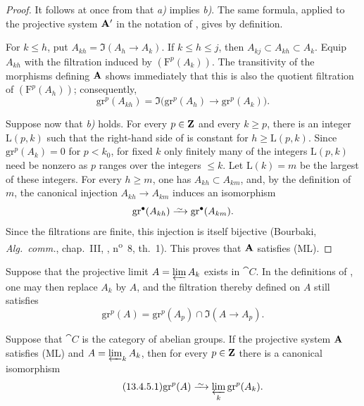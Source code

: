 \begin{proof}
It follows at once from  that \emph{a)} implies
\emph{b)}. The same formula, applied to the projective system
$\mathbf{A}'$ in the notation of , gives
 by definition.

For $k\leq h$, put $A_{kh}=\Im(A_h\longrightarrow A_k)$.
If $k\leq h\leq j$, then
$A_{kj}\subset A_{kh}\subset A_k$.
Equip $A_{kh}$ with the filtration induced by
$(\mathrm{F}^p(A_k))$.
The transitivity of the morphisms defining $\mathbf{A}$ shows
immediately that this is also the quotient filtration of
$(\mathrm{F}^p(A_h))$; consequently,
\begin{equation}
\label{0.13.4.3.2}
\tag{13.4.3.2}
  \mathrm{gr}^p(A_{kh})
  =
  \Im\bigl(
    \mathrm{gr}^p(A_h)\longrightarrow\mathrm{gr}^p(A_k)
  \bigr).
\end{equation}

Suppose now that \emph{b)} holds.
For every $p\in\mathbf{Z}$ and every $k\geq p$, there is an integer
$\mathrm{L}(p,k)$ such that the right-hand side of
 is constant for $h\geq\mathrm{L}(p,k)$.
Since $\mathrm{gr}^p(A_k)=0$ for $p<k_0$, for fixed $k$ only
finitely many of the integers $\mathrm{L}(p,k)$ need be nonzero as
$p$ ranges over the integers $\leq k$.
Let $\mathrm{L}(k)=m$ be the largest of these integers.
For every $h\geq m$, one has
$A_{kh}\subset A_{km}$, and, by the definition of $m$, the canonical
injection
$A_{kh}\longrightarrow A_{km}$ induces an isomorphism
\[
  \mathrm{gr}^\bullet(A_{kh})
  \simto
  \mathrm{gr}^\bullet(A_{km}).
\]
Since the filtrations are finite, this injection is itself bijective
(Bourbaki, \emph{Alg.\ comm.}, chap.~III, ,
n\textsuperscript{o}~8, th.~1).
This proves that $\mathbf{A}$ satisfies (ML).
\end{proof}

\begin{env}[13.4.4]
\label{0.13.4.4}
Suppose that the projective limit
$A=\varprojlim A_k$ exists in $\cat{C}$.
In the definitions of , one may then replace $A_k$ by
$A$, and the filtration thereby defined on $A$ still satisfies
\begin{equation}
\label{0.13.4.4.1}
\tag{13.4.4.1}
  \mathrm{gr}^p(A)
  =
  \mathrm{gr}^p(A_p)
  \cap
  \Im(A\longrightarrow A_p).
\end{equation}
\end{env}

\begin{corollary}[13.4.5]
\label{0.13.4.5}
Suppose that $\cat{C}$ is the category of abelian groups.
If the projective system $\mathbf{A}$ satisfies \textup{(ML)} and
$A=\varprojlim_k A_k$, then for every $p\in\mathbf{Z}$ there is a
canonical isomorphism
\begin{equation}
\label{0.13.4.5.1}
\tag{13.4.5.1}
  \mathrm{gr}^p(A)
  \isoto
  \varprojlim_k\mathrm{gr}^p(A_k).
\end{equation}
\end{corollary}

